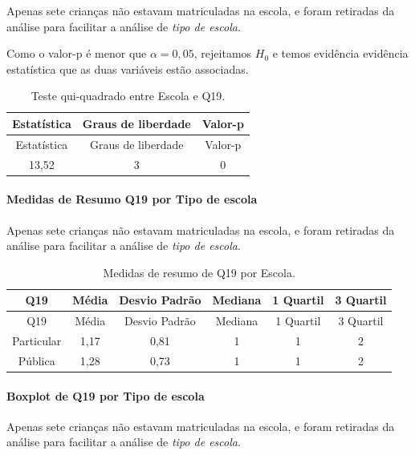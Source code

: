 \documentclass[]{article}
\let\oldparagraph\paragraph
\renewcommand{\paragraph}[1]{\oldparagraph{#1}\mbox{}}
\begin{document}
Apenas sete crianças não estavam matriculadas na escola, e foram retiradas da análise para facilitar a análise de \emph{tipo de escola}.

Como o valor-p é menor que \(\alpha=0,05\), rejeitamos \(H_0\) e temos evidência evidência estatística que as duas variáveis estão associadas.

\begin{longtable}[]{@{}ccc@{}}
\caption{\label{tab:unnamed-chunk-280}Teste qui-quadrado entre Escola e Q19.}\tabularnewline
\toprule
Estatística & Graus de liberdade & Valor-p\tabularnewline
\midrule
\endfirsthead
\toprule
Estatística & Graus de liberdade & Valor-p\tabularnewline
\midrule
\endhead
13,52 & 3 & 0\tabularnewline
\bottomrule
\end{longtable}

\cleardoublepage

\hypertarget{medidas-de-resumo-q19-por-tipo-de-escola}{%
\paragraph{Medidas de Resumo Q19 por Tipo de escola}\label{medidas-de-resumo-q19-por-tipo-de-escola}}

Apenas sete crianças não estavam matriculadas na escola, e foram retiradas da análise para facilitar a análise de \emph{tipo de escola}.

\begin{longtable}[]{@{}cccccc@{}}
\caption{\label{tab:unnamed-chunk-281}Medidas de resumo de Q19 por Escola.}\tabularnewline
\toprule
Q19 & Média & Desvio Padrão & Mediana & 1 Quartil & 3 Quartil\tabularnewline
\midrule
\endfirsthead
\toprule
Q19 & Média & Desvio Padrão & Mediana & 1 Quartil & 3 Quartil\tabularnewline
\midrule
\endhead
Particular & 1,17 & 0,81 & 1 & 1 & 2\tabularnewline
Pública & 1,28 & 0,73 & 1 & 1 & 2\tabularnewline
\bottomrule
\end{longtable}

\hypertarget{boxplot-de-q19-por-tipo-de-escola}{%
\paragraph{Boxplot de Q19 por Tipo de escola}\label{boxplot-de-q19-por-tipo-de-escola}}

Apenas sete crianças não estavam matriculadas na escola, e foram retiradas da análise para facilitar a análise de \emph{tipo de escola}.
\end{document}
